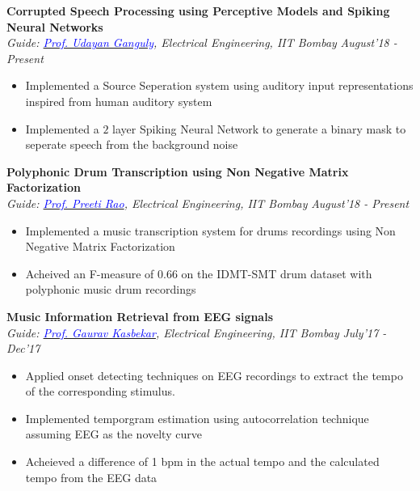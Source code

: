 \documentclass[margin,line]{res}
\begin{document}
\begin{resume}
{\bf Corrupted Speech Processing using Perceptive Models and Spiking Neural Networks} \\
{\em Guide: \href{https://www.ee.iitb.ac.in/wiki/faculty/udayan}{\textcolor{blue}{Prof. Udayan Ganguly}}, Electrical Engineering, IIT Bombay} \hfill {\it August'18 - Present}\\
\vspace*{-.13in}
\begin{itemize}
\item Implemented a Source Seperation system using auditory input representations inspired from human auditory system 
\item Implemented a $2$ layer Spiking Neural Network to generate a binary mask to seperate speech from the background noise
\end{itemize}


{\bf Polyphonic Drum Transcription using Non Negative Matrix Factorization} \\
{\em Guide: \href{https://www.ee.iitb.ac.in/wiki/faculty/prao}{\textcolor{blue}{Prof. Preeti Rao}}, Electrical Engineering, IIT Bombay} \hfill {\it August'18 - Present}\\
\vspace*{-.13in}
\begin{itemize}
\item Implemented a music transcription system for drums recordings using Non Negative Matrix Factorization
\item Acheived an F-measure of $0.66$ on the IDMT-SMT drum dataset with polyphonic music drum recordings
\end{itemize}


{\bf Music Information Retrieval from EEG signals} \\
{\em Guide: \href{https://www.ee.iitb.ac.in/~gskasbekar/}{\textcolor{blue}{Prof. Gaurav Kasbekar}}, Electrical Engineering, IIT Bombay} \hfill {\it July'17 - Dec'17}\\
\vspace*{-.13in}
\begin{itemize}
\item Applied onset detecting techniques on EEG recordings to extract the tempo of the corresponding stimulus.
\item Implemented temporgram estimation using autocorrelation technique assuming EEG as the novelty curve
\item Acheieved a difference of 1 bpm in the actual tempo and the calculated tempo from the EEG data 
\end{itemize}



\end{resume}
\end{document}

